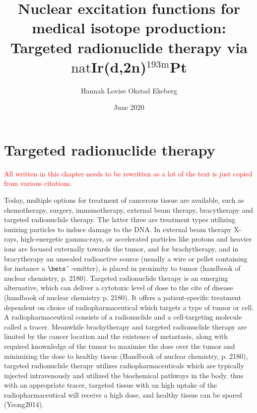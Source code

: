 \documentclass[a4paper,11pt,twoside]{book}
\title{Nuclear excitation functions for medical isotope production:\\
Targeted radionuclide therapy via $\text{nat}$Ir(d,2n)$^{193\text{m}}$Pt}
\author{Hannah Lovise Okstad Ekeberg}
\date{June 2020}
\begin{document}
\maketitle
\tableofcontents


%
%
%
%
%
%
%
%
%



\chapter{Targeted radionuclide therapy}
\textcolor{red}{All written in this chapter needs to be rewritten as a lot of the text is just copied from various citations.}

Today, multiple options for treatment of cancerous tissue are available, such as chemotherapy, surgery, immunotherapy, external beam therapy, bracytherapy and targeted radionuclide therapy. The latter three are treatment types utilizing ionizing particles to induce damage to the DNA. In external beam therapy X-rays, high-energetic gamma-rays, or accelerated particles like protons and heavier ions are focused externally towards the tumor, and for brachytherapy, and in bracytherapy an unsealed radioactive source (usually a wire or pellet containing for instance a $\bets^-$-emitter), is placed in proximity to tumor (handbook of nuclear chemistry, p. 2180). Targeted radionuclide therapy is an emerging alternative, which can deliver a cytotoxic level of dose to the cite of disease (handbook of nuclear chemistry p. 2180). It offers a patient-specific treatment dependent on choice of radiopharmaceutical which targets a type of tumor or cell. A radiopharmaceutical consists of a radionuclide and a cell-targeting molecule called a tracer. Meanwhile brachytherapy and targeted radionuclide therapy are limited by the cancer location and the existence of metastasis, along with required knownledge of the tumor to maximise the dose over the tumor and minimizing the dose to healthy tissue (Handbook of nuclear chemistry, p. 2180), targeted radionuclide therapy utilizes radiopharmaceuticals which are typically injected intravenously and utilized the biochemical pathways in the body. thus with an appropriate tracer, targeted tissue with an high uptake of the radiopharmaceutical will receive a high dose, and healthy tissue can be spared (Yeong2014).\\ 
\end{document}
